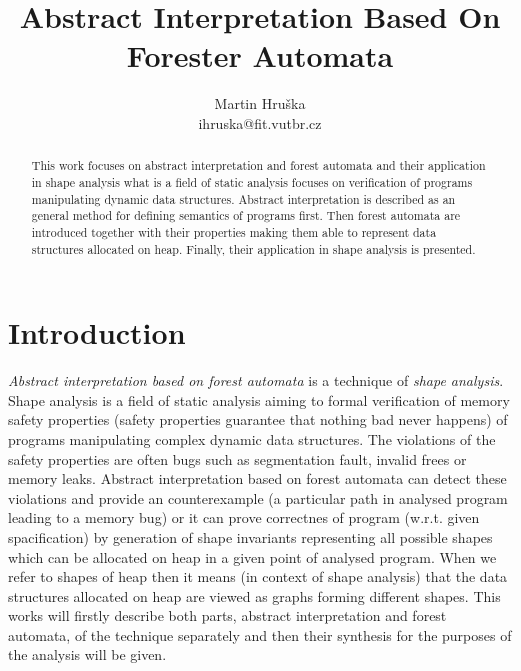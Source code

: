 \documentclass[a4paper, 12pt]{article}
\title{Abstract Interpretation Based On Forester Automata}
\author{Martin Hruška\\ihruska@fit.vutbr.cz}
\date{}
\begin{document}
\maketitle

\begin{abstract}
This work focuses on abstract interpretation and
forest automata and their application in shape analysis
what is a field of static analysis focuses on verification of
programs manipulating dynamic data structures.
Abstract interpretation is described as an general method
for defining semantics of programs first.
Then forest automata are introduced together with their properties
making them able to represent data structures allocated on heap.
Finally, their application in shape analysis is presented. 
\end{abstract}

\tableofcontents

\section{Introduction}
\label{sec:intro}

\emph{Abstract interpretation based on forest automata} is a technique of \emph{shape analysis}.
Shape analysis is a field of static analysis aiming to
formal verification of memory safety properties (safety properties
guarantee that nothing bad never happens) of
programs manipulating complex dynamic data structures.
The violations of the safety properties are often bugs
such as segmentation fault, invalid frees or memory leaks.
Abstract interpretation based on forest automata can detect these violations
and provide an counterexample (a particular path in analysed program
leading to a memory bug) or it can prove correctnes of program (w.r.t. given spacification)
by generation of shape invariants representing all possible shapes which
can be allocated on heap in a given point of analysed program.
When we refer to shapes of heap then it means (in context of shape analysis)
that the data structures allocated on heap are viewed
as graphs forming different shapes.
This works will firstly describe both parts, abstract interpretation and forest automata,
of the technique separately and then their
synthesis for the purposes of the analysis will be given.
\end{document}
